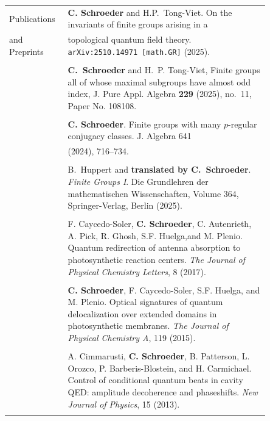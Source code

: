 \documentclass[letterpaper,12pt,oneside]{article}
\begin{document}
\noindent \begin{longtable}[l]{p{0.15\linewidth}p{0.7\linewidth}}
\large{Publications} & \textbf{C. Schroeder} and H.P.~Tong-Viet. On the invariants of finite groups arising in a \\ 
\large{and Preprints} & topological quantum field theory. {\tt arXiv:2510.14971 [math.GR]} (2025). \\
&\\
 & \textbf{C.~Schroeder} and H.~P. Tong-Viet, Finite groups all of whose maximal subgroups have almost odd index, J. Pure Appl. Algebra {\bf 229} (2025), no.~11, Paper No. 108108. \\
&\\

& \textbf{C. Schroeder}. Finite groups with many $p$-regular conjugacy classes. J. Algebra 641 \\
& (2024), 716--734. \\
&\\



& B.~Huppert and \textbf{translated by C.~Schroeder}. \emph{Finite Groups I}. Die Grundlehren der mathematischen Wissenschaften, Volume 364, Springer-Verlag, Berlin (2025).\\
&\\
 
& F. Caycedo-Soler, \textbf{C. Schroeder}, C. Autenrieth, A. Pick, R. Ghosh, S.F. Huelga,and M. Plenio. Quantum redirection of antenna absorption to photosynthetic reaction centers. \emph{The Journal of Physical Chemistry Letters}, 8 (2017). \\
& \\
     
& \textbf{C. Schroeder}, F. Caycedo-Soler, S.F. Huelga, and M. Plenio. Optical signatures of quantum delocalization over extended domains in photosynthetic membranes. \emph{The Journal of Physical Chemistry A}, 119 (2015). \\
& \\

& A. Cimmarusti, \textbf{C. Schroeder}, B. Patterson, L. Orozco, P. Barberis-Blostein, and H. Carmichael. Control of conditional quantum beats in cavity QED: amplitude decoherence and phaseshifts. \emph{New Journal of Physics}, 15 (2013). \\
& \\


\end{longtable}
\end{document}
